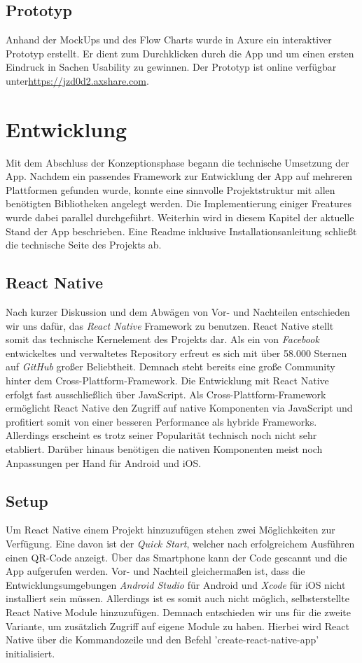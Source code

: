 \section{Prototyp}
Anhand der MockUps und des Flow Charts wurde in Axure ein interaktiver Prototyp erstellt. Er dient zum Durchklicken durch die App und um einen ersten Eindruck in Sachen Usability zu gewinnen. Der Prototyp ist online verfügbar unter\newline \url{https://jzd0d2.axshare.com}.



\chapter{Entwicklung}
\label{entwicklung}
Mit dem Abschluss der Konzeptionsphase begann die technische Umsetzung der App.
Nachdem ein passendes Framework zur Entwicklung der App auf mehreren Plattformen gefunden wurde, konnte eine sinnvolle Projektstruktur mit allen benötigten Bibliotheken angelegt werden.
Die Implementierung einiger Freatures wurde dabei parallel durchgeführt.
Weiterhin wird in diesem Kapitel der aktuelle Stand der App beschrieben.
Eine Readme inklusive Installationsanleitung schließt die technische Seite des Projekts ab.

\section{React Native}
\label{sec:reactnative}
Nach kurzer Diskussion und dem Abwägen von Vor- und Nachteilen entschieden wir uns dafür, das \emph{React Native} Framework zu benutzen.
React Native stellt somit das technische Kernelement des Projekts dar.
Als ein von \emph{Facebook} entwickeltes und verwaltetes Repository erfreut es sich mit über 58.000 Sternen auf \emph{GitHub} großer Beliebtheit.
Demnach steht bereits eine große Community hinter dem Cross-Plattform-Framework.
Die Entwicklung mit React Native erfolgt fast ausschließlich über JavaScript.
Als Cross-Plattform-Framework ermöglicht React Native den Zugriff auf native Komponenten via JavaScript und profitiert somit von einer besseren Performance als hybride Frameworks.
Allerdings erscheint es trotz seiner Popularität technisch noch nicht sehr etabliert.
Darüber hinaus benötigen die nativen Komponenten meist noch Anpassungen per Hand für Android und iOS.

\section{Setup}
Um React Native einem Projekt hinzuzufügen stehen zwei Möglichkeiten zur Verfügung.
Eine davon ist der \emph{Quick Start}, welcher nach erfolgreichem Ausführen einen QR-Code anzeigt.
Über das Smartphone kann der Code gescannt und die App aufgerufen werden.
Vor- und Nachteil gleichermaßen ist, dass die Entwicklungsumgebungen \emph{Android Studio} für Android und \emph{Xcode} für iOS nicht installiert sein müssen.
Allerdings ist es somit auch nicht möglich, selbsterstellte React Native Module hinzuzufügen.
Demnach entschieden wir uns für die zweite Variante, um zusätzlich Zugriff auf eigene Module zu haben.
Hierbei wird React Native über die Kommandozeile und den Befehl 'create-react-native-app' initialisiert.

